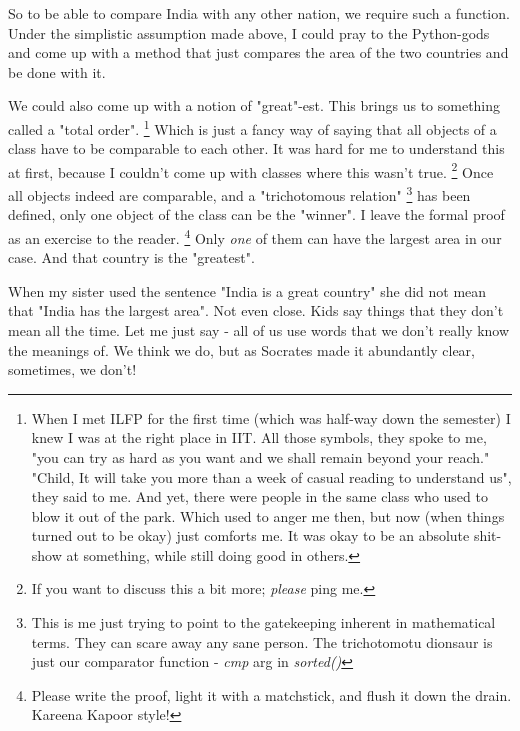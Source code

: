 \documentclass[]{report}
\begin{document}
So to be able to compare India with any other nation, we require such a function. 
Under the simplistic assumption made above, I could pray to the Python-gods and come up with a method that just compares the area of the two countries and be done with it.

We could also come up with a notion of "great"-est. 
This brings us to something called a "total order".
\footnote{
    When I met ILFP for the first time (which was half-way down the semester) I knew I was at the right place in IIT. 
    All those symbols, they spoke to me, "you can try as hard as you want and we shall remain beyond your reach."
    "Child, It will take you more than a week of casual reading to understand us", they said to me.
    And yet, there were people in the same class who used to blow it out of the park.
    Which used to anger me then, but now (when things turned out to be okay) just comforts me.
    It was okay to be an absolute shit-show at something, while still doing good in others.
}
Which is just a fancy way of saying that all objects of a class have to be comparable to each other.
It was hard for me to understand this at first, because I couldn't come up with classes where this wasn't true. 
\footnote{If you want to discuss this a bit more; \textit{please} ping me.}
Once all objects indeed are comparable, and a "trichotomous relation" 
\footnote{
    This is me just trying to point to the gatekeeping inherent in mathematical terms. 
    They can scare away any sane person.
    The trichotomotu dionsaur is just our comparator function - \textit{cmp} arg in \textit{sorted()}
}
has been defined, only one object of the class can be the "winner". I leave the formal proof as an exercise to the reader. 
\footnote{
    Please write the proof, light it with a matchstick, and flush it down the drain.
    Kareena Kapoor style!
}
Only \textit{one} of them can have the largest area in our case.
And that country is the "greatest".

\newpage

When my sister used the sentence "India is a great country" she did not mean that "India has the largest area". Not even close. 
Kids say things that they don't mean all the time. 
Let me just say - all of us use words that we don't really know the meanings of.
We think we do, but as Socrates made it abundantly clear, sometimes, we don't!
\end{document}
